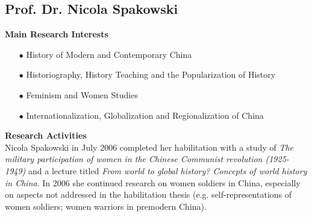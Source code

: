\subsection{Prof. Dr. Nicola Spakowski}


\textbf{Main Research Interests}\\[-0.25cm]
\begin{enumerate}
\item[$\bullet$]	History of Modern and Contemporary China
\item[$\bullet$]	Historiography, History Teaching and the Popularization of History
\item[$\bullet$]	Feminism and Women Studies
\item[$\bullet$]	Internationalization, Globalization and Regionalization of China
\end{enumerate}


\vspace{0.6cm}
\textbf{Research Activities}\\[-0.25cm]

Nicola Spakowski in July 2006 completed her habilitation with a study of \textit{The military participation of women in the Chinese Communist revolution (1925-1949)} and a lecture titled \textit{From world to global history? Concepts of world history in China}. In 2006 she continued research on women soldiers in China, especially on aspects not addressed in the habilitation thesis (e.g. self-representations of women soldiers; women warriors in premodern China). 

